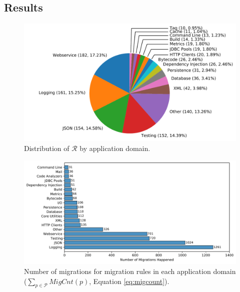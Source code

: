\documentclass[sigconf, screen]{acmart}
\begin{document}
\subsection{Results}

\begin{figure}
  \centering
  \includegraphics[width=\linewidth]{fig/migcat.pdf}
  \vspace{-6mm}
  \caption{Distribution of $\mathcal{R}$ by application domain.}
  \label{fig:migcat}
  \vspace{-4mm}
\end{figure}

\begin{figure}
  \centering
  \includegraphics[width=\linewidth]{fig/migrepodist.pdf}
  \vspace{-6mm}
  \caption{Number of migrations for migration rules in each application domain ($\sum_{p\in \mathcal{P}} MigCnt(p)$, Equation \ref{eq:migcount}).}
  \label{fig:migrepodist}
  \vspace{-4mm}
\end{figure}
\end{document}
